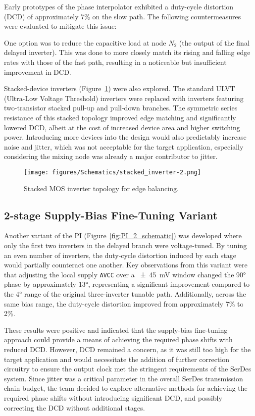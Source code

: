 Early prototypes of the phase interpolator exhibited a duty-cycle distortion (DCD) of approximately 7\% on the slow path. The following countermeasures were evaluated to mitigate this issue:

One option was to reduce the capacitive load at node $N_2$ (the output of the final delayed inverter). This was done to more closely match its rising and falling edge rates with those of the fast path, resulting in a noticeable but insufficient improvement in DCD.

Stacked-device inverters (Figure~\ref{fig:stacked_inv}) were also explored. The standard ULVT (Ultra-Low Voltage Threshold) inverters were replaced with inverters featuring two-transistor stacked pull-up and pull-down branches. The symmetric series resistance of this stacked topology improved edge matching and significantly lowered DCD, albeit at the cost of increased device area and higher switching power. Introducing more devices into the design would also predictably increase noise and jitter, which was not acceptable for the target application, especially considering the mixing node was already a major contributor to jitter.

\begin{figure}[h]
  \centering
  \texttt{[image: figures/Schematics/stacked\_inverter-2.png]}
  \caption{Stacked MOS inverter topology for edge balancing.}
  \label{fig:stacked_inv}
\end{figure}

\subsection{2-stage Supply-Bias Fine-Tuning Variant}\label{sec:avcc_finetune}

Another variant of the PI (Figure~\ref{fig:PI_2_schematic}) was developed where only the first two inverters in the delayed branch were voltage-tuned. By tuning an even number of inverters, the duty‑cycle distortion induced by each stage would partially counteract one another. Key observations from this variant were that adjusting the local supply \texttt{AVCC} over a \SI{\pm45}{\milli\volt} window changed the \ang{90} phase by approximately \ang{13}, representing a significant improvement compared to the \ang{4} range of the original three-inverter tunable path. Additionally, across the same bias range, the duty-cycle distortion improved from approximately 7\% to 2\%.

These results were positive and indicated that the supply-bias fine-tuning approach could provide a means of achieving the required phase shifts with reduced DCD. However, DCD remained a concern, as it was still too high for the target application and would necessitate the addition of further correction circuitry to ensure the output clock met the stringent requirements of the SerDes system. Since jitter was a critical parameter in the overall SerDes transmission chain budget, the team decided to explore alternative methods for achieving the required phase shifts without introducing significant DCD, and possibly correcting the DCD without additional stages.


